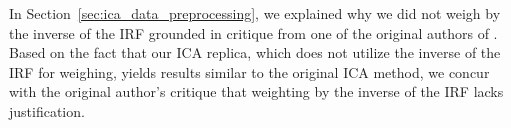 In Section~\ref{sec:ica_data_preprocessing}, we explained why we did not weigh by the inverse of the IRF grounded in critique from one of the original authors of \citet{cleggRecalibrationMarsScience2017}.
Based on the fact that our ICA replica, which does not utilize the inverse of the IRF for weighing, yields results similar to the original ICA method, we concur with the original author's critique that weighting by the inverse of the IRF lacks justification.
